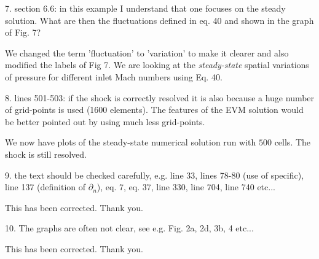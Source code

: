 \documentclass{article}
\begin{document}
{
\color{blue}
7. section 6.6: in this example I understand that one focuses on the steady solution. What are then the fluctuations defined in eq. 40 and shown in the graph of Fig. 7?
}

We changed the term 'fluctuation' to 'variation' to make it clearer and also modified the labels of Fig 7. We are looking at the \emph{steady-state} spatial variations of pressure for different inlet Mach numbers using Eq. 40.
\bigskip


{
\color{blue}
8. lines 501-503: if the shock is correctly resolved it is also because a huge number of grid-points is used (1600 elements). The features  of the EVM solution would be better pointed out by using much less grid-points.
}

We now have plots of the steady-state numerical solution run with $500$ cells. The shock is still resolved.
\bigskip


{
\color{blue}
9. the text should be checked carefully, e.g. line 33, lines 78-80 (use of specific), line 137 (definition of $\partial_n$), eq. 7, eq. 37, line 330, line 704, line 740 etc...
}

This has been corrected. Thank you.
\bigskip


{
\color{blue}
10. The graphs are often not clear, see e.g. Fig. 2a, 2d, 3b, 4 etc...
}

This has been corrected. Thank you.
\bigskip
\end{document}

